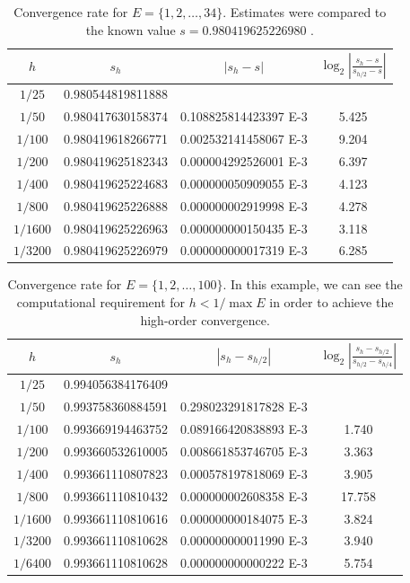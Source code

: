 \documentclass[10pt]{article}
\theoremstyle{definition}
\numberwithin{equation}{section}
\numberwithin{figure}{section}
\numberwithin{table}{section}
\begin{document}
\begin{table}
\centering
\begin{tabular}{c|ccc}
$h$&$s_h$&$|s_h-s|$&$\log_2\left|\frac{s_h-s}{s_{h/2}-s}\right|$\\\hline
$1/25$ & 0.980544819811888 &  & \\
$1/50$ & 0.980417630158374 & 0.108825814423397 E-3  & 5.425 \\
$1/100$ & 0.980419618266771 & 0.002532141458067 E-3  & 9.204 \\
$1/200$ & 0.980419625182343 & 0.000004292526001 E-3  & 6.397  \\
$1/400$ & 0.980419625224683 & 0.000000050909055 E-3 & 4.123 \\
$1/800$ & 0.980419625226888 & 0.000000002919998 E-3   & 4.278 \\
$1/1600$ & 0.980419625226963 & 0.000000000150435 E-3  & 3.118 \\
$1/3200$ & 0.980419625226979 & 0.000000000017319 E-3 & 6.285 \\
\end{tabular}
\caption{Convergence rate for $E=\{1,2,\dots,34\}$. Estimates were compared to the known value $s= 0.980 419 625 226 980$ \cite{falk2021hidden}.}
\label{table:conv34}
\end{table}

\begin{table}[b]
\centering
\begin{tabular}{c|ccc}
$h$&$s_h$&$|s_h-s_{h/2}|$&$\log_2\left|\frac{s_h-s_{h/2}}{s_{h/2}-s_{h/4}}\right|$\\\hline
$1/25$ & 0.994056384176409 &  & \\
$1/50$ & 0.993758360884591 & 0.298023291817828 E-3  & \\
$1/100$ & 0.993669194463752 & 0.089166420838893 E-3  & 1.740 \\
$1/200$ & 0.993660532610005 & 0.008661853746705 E-3  & 3.363  \\
$1/400$ & 0.993661110807823 & 0.000578197818069 E-3 & 3.905 \\
$1/800$ & 0.993661110810432 & 0.000000002608358 E-3  & 17.758\\
$1/1600$ & 0.993661110810616 & 0.000000000184075 E-3 & 3.824\\
$1/3200$ & 0.993661110810628 & 0.000000000011990 E-3 & 3.940\\
$1/6400$ & 0.993661110810628 & 0.000000000000222 E-3 & 5.754\\
\end{tabular}
\caption{Convergence rate for $E=\{1,2,\dots,100\}$. In this example, we can see the computational requirement for $h<1/\max E$ in order to achieve the high-order convergence.}
\label{table:conv100}
\end{table}
\end{document}
